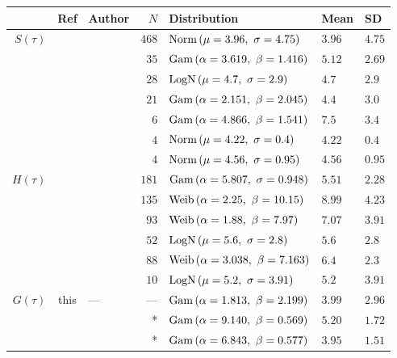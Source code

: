{\small\centering
\begin{tabular}{rclrlll}
	\toprule
	          &         Ref         & Author                    &   $N$ & Distribution                           & Mean   & SD     \\
	\midrule
	$S(\tau)$ &    \cite{Du2020}    & \citeauthor{Du2020}       & $468$ & $\mathop{\mathrm{Norm}}{\left(\mu=3.96,~\sigma=4.75\right)}$     & $3.96$ & $4.75$ \\
	          &  \cite{Zhang2020}   & \citeauthor{Zhang2020}    &  $35$ & $\mathop{\mathrm{Gam}}{\left(\alpha=3.619,~\beta=1.416\right)}$  & $5.12$ & $2.69$ \\
	          & \cite{Nishiura2020} & \citeauthor{Nishiura2020} &  $28$ & $\mathop{\mathrm{LogN}}{\left(\mu=4.7,~\sigma=2.9\right)}$       & $4.7$  & $2.9$  \\
	          &   \cite{Zhao2020}   & \citeauthor{Zhao2020}     &  $21$ & $\mathop{\mathrm{Gam}}{\left(\alpha=2.151,~\beta=2.045\right)}$  & $4.4$  & $3.0$  \\
	          &    \cite{Li2020}    & \citeauthor{Li2020}       &   $6$ & $\mathop{\mathrm{Gam}}{\left(\alpha=4.866,~\beta=1.541\right)}$  & $7.5$  & $3.4$  \\
	          & \cite{Tindale2020}  & \citeauthor{Tindale2020}  &   $4$ & $\mathop{\mathrm{Norm}}{\left(\mu=4.22,~\sigma=0.4\right)}$      & $4.22$ & $0.4$  \\
	          & \cite{Tindale2020}  & \citeauthor{Tindale2020}  &   $4$ & $\mathop{\mathrm{Norm}}{\left(\mu=4.56,~\sigma=0.95\right)}$     & $4.56$ & $0.95$ \\
	\midrule
	$H(\tau)$ &  \cite{Lauer2020}   & \citeauthor{Lauer2020}    & $181$ & $\mathop{\mathrm{Gam}}{\left(\alpha=5.807,~\sigma=0.948\right)}$ & $5.51$ & $2.28$ \\
	          & \cite{Tindale2020}  & \citeauthor{Tindale2020}  & $135$ & $\mathop{\mathrm{Weib}}{\left(\alpha=2.25,~\beta=10.15\right)}$  & $8.99$ & $4.23$ \\
	          & \cite{Tindale2020}  & \citeauthor{Tindale2020}  &  $93$ & $\mathop{\mathrm{Weib}}{\left(\alpha=1.88,~\beta=7.97\right)}$   & $7.07$ & $3.91$ \\
	          &  \cite{Linton2020}  & \citeauthor{Linton2020}   &  $52$ & $\mathop{\mathrm{LogN}}{\left(\mu=5.6,~\sigma=2.8\right)}$       & $5.6$  & $2.8$  \\
	          &  \cite{Backer2020}  & \citeauthor{Backer2020}   &  $88$ & $\mathop{\mathrm{Weib}}{\left(\alpha=3.038,~\beta=7.163\right)}$ & $6.4$  & $2.3$  \\
	          &    \cite{Li2020}    & \citeauthor{Li2020}       &  $10$ & $\mathop{\mathrm{LogN}}{\left(\mu=5.2,~\sigma=3.91\right)}$      & $5.2$  & $3.91$ \\
	\midrule
	$G(\tau)$ &        this         & ---                       &   --- & $\mathop{\mathrm{Gam}}{\left(\alpha=1.813,~\beta=2.199\right)}$  & $3.99$ & $2.96$ \\
	          & \cite{Ganyani2020}  & \citeauthor{Ganyani2020}  &     * & $\mathop{\mathrm{Gam}}{\left(\alpha=9.140,~\beta=0.569\right)}$  & $5.20$ & $1.72$ \\
	          & \cite{Ganyani2020}  & \citeauthor{Ganyani2020}  &     * & $\mathop{\mathrm{Gam}}{\left(\alpha=6.843,~\beta=0.577\right)}$  & $3.95$ & $1.51$ \\
	\bottomrule
\end{tabular}}
